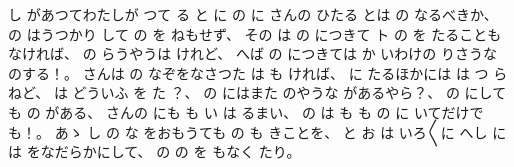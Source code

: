 %
し
があつてわたしが
つて
る
と
に
の
に
さんの
ひたる
とは
の
なるべきか、
%
の
はうつかり
して
の
を
ねもせず、
%
その
は
の
につきて
ト
の
を
たることもなければ、
%
の
らうやうは
けれど、
%
へば
の
につきては
か
いわけの
りさうな
のする！。
%
さんは
の
なぞをなさつた
は
も
ければ、
%
に
たるほかには
は
つ
らねど、
%
は
どういふ
を
た
？、
%
の
にはまた
のやうな
があるやら？、
%
の
にしても
の
がある、
%
さんの
にも
も
い
は
るまい、
%
の
は
も
も
の
に
いてだけでも！。
%
あゝ
し
の
な
をおもうても
の
も
きことを、
%
と
お
は
いろ〳〵に
へし
には
をなだらかにして、
%
の
の
を
もなく
たり。
